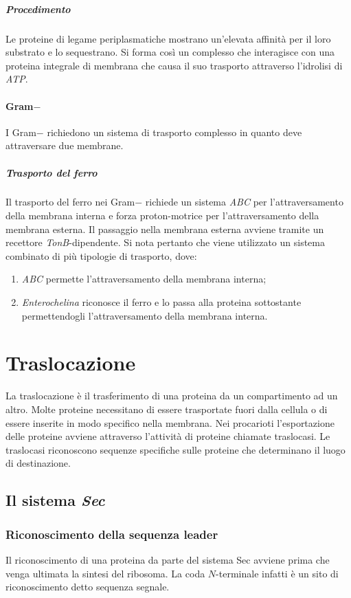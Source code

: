 				\subparagraph{Procedimento}
				Le proteine di legame periplasmatiche mostrano un'elevata affinit\`a per il loro substrato e lo sequestrano.
				Si forma cos\`i un complesso che interagisce con una proteina integrale di membrana che causa il suo trasporto attraverso l'idrolisi di \emph{ATP}.

			\paragraph{Gram$\mathbf{-}$}
			I Gram$-$ richiedono un sistema di trasporto complesso in quanto deve attraversare due membrane.

				\subparagraph{Trasporto del ferro}
				Il trasporto del ferro nei Gram$-$ richiede un sistema \emph{ABC} per l'attraversamento della membrana interna e forza proton-motrice per l'attraversamento della membrana esterna.
				Il passaggio nella membrana esterna avviene tramite un recettore \emph{TonB}-dipendente.
				Si nota pertanto che viene utilizzato un sistema combinato di pi\`u tipologie di trasporto, dove:
				\begin{enumerate}
					\item \emph{ABC} permette l'attraversamento della membrana interna; 
					\item \emph{Enterochelina} riconosce il ferro e lo passa alla proteina sottostante permettendogli l'attraversamento della membrana interna.
				\end{enumerate}
\section{Traslocazione}
La traslocazione \`e il trasferimento di una proteina da un compartimento ad un altro. 
Molte proteine necessitano di essere trasportate fuori dalla cellula o di essere inserite in modo specifico nella membrana. 
Nei procarioti l'esportazione delle proteine avviene attraverso l'attivit\`a di proteine chiamate traslocasi. 
Le traslocasi riconoscono sequenze specifiche sulle proteine che determinano il luogo di destinazione.

	\subsection{Il sistema \emph{Sec}}

		\subsubsection{Riconoscimento della sequenza leader}
		Il riconoscimento di una proteina da parte del sistema Sec avviene prima che venga ultimata la sintesi del ribosoma. 
		La coda $N$-terminale infatti \`e un sito di riconoscimento detto sequenza segnale.

